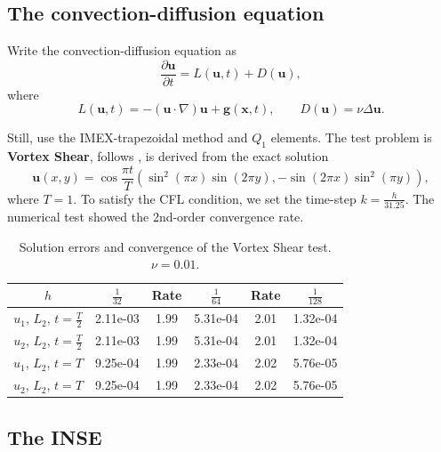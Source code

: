 \documentclass[lang=en,11pt,a4paper,bibend=bibtex]{elegantpaper}
\begin{document}
\subsection{The convection-diffusion equation}

Write the convection-diffusion equation as
\begin{equation}
    \frac{\partial \mathbf{u}}{\partial t}=L(\mathbf{u},t)+D(\mathbf{u}),
\end{equation}
where
\begin{equation*}
    L(\mathbf{u},t)=-(\mathbf{u}\cdot\nabla)\mathbf{u}
    +\mathbf{g}(\mathbf{x},t),
    \qquad D(\mathbf{u})=\nu\Delta\mathbf{u}.
\end{equation*}

Still, use the IMEX-trapezoidal method and $Q_1$ elements.
The test problem is \textbf{Vortex Shear}, follows \cite{Zhang2011}, 
is derived from the exact solution
\begin{equation}
    \mathbf{u}(x,y)=\cos\frac{\pi t}{T}(\sin^2(\pi x)\sin(2\pi y),
    -\sin(2\pi x)\sin^2(\pi y)),
\end{equation}
where $T=1$. To satisfy the CFL condition, we set the time-step
$k=\frac{h}{31.25}$. The numerical test showed the 2nd-order
convergence rate.

\begin{table}[H]
    \centering
    \begin{tabular}{cccccc}
    \hline
    $h$                                    & $\frac{1}{32}$ & 
    Rate & $\frac{1}{64}$ & Rate & $\frac{1}{128}$ \\ \hline
    $u_1$, $L_2$, $t=\frac{T}{2}$ & 2.11e-03    & 1.99 
    & 5.31e-04   & 2.01 & 1.32e-04    \\
    $u_2$, $L_2$, $t=\frac{T}{2}$ & 2.11e-03    & 1.99 
    & 5.31e-04   & 2.01 & 1.32e-04    \\ \hline
    $u_1$, $L_2$, $t=T$           & 9.25e-04   & 1.99 
    & 2.33e-04   & 2.02 & 5.76e-05    \\
    $u_2$, $L_2$, $t=T$           & 9.25e-04   & 1.99 
    & 2.33e-04   & 2.02 & 5.76e-05    \\ \hline
    \end{tabular}
    \caption{Solution errors and convergence of the Vortex Shear test.
     $\nu=0.01$.}
\end{table}

\subsection{The INSE}
\end{document}
